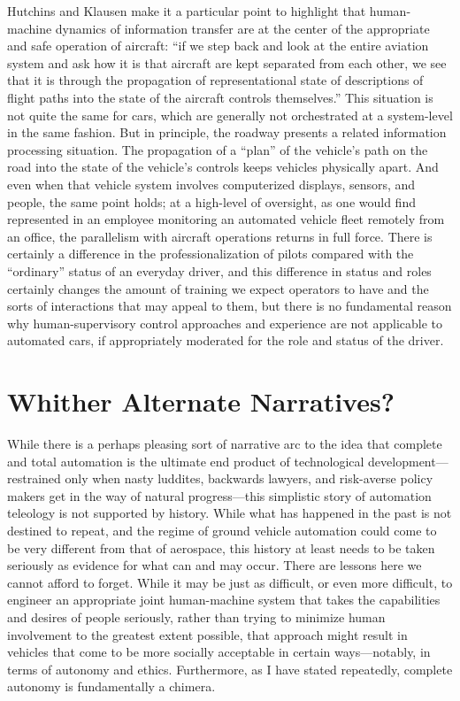 Hutchins and Klausen make it a particular point to highlight that
human-machine dynamics of information transfer are at the center of
the appropriate and safe operation of aircraft: ``if we step back and
look at the entire aviation system and ask how
it is that aircraft are kept separated from each other, we see that it
is through the propagation of representational state of descriptions
of flight paths into the state of the aircraft controls
themselves.''\cite[p. 14]{hutchinsKlausen} This situation is not quite
the same for cars, which are generally not orchestrated at a
system-level in the same fashion. But in principle, the roadway presents a related
information processing situation. The propagation of a ``plan'' of the
vehicle's path on the 
road into the state of the vehicle's controls keeps vehicles
physically apart.
And even when that vehicle system involves computerized
displays, sensors, and people, the same point holds;  at a high-level of oversight, as
one would find represented in an employee monitoring an automated
vehicle fleet remotely 
from an office, the parallelism with aircraft operations returns in
full force. There is certainly a difference in the
professionalization of pilots compared with the ``ordinary'' status of an
everyday driver, and this difference in status and roles certainly
changes the amount of training we expect operators to have and the
sorts of interactions that may appeal to them, but there is no
fundamental reason why human-supervisory control approaches and
experience are not applicable to automated cars, if appropriately
moderated for the role and status of the driver. 

\section{Whither Alternate Narratives?}

While there is a perhaps pleasing sort of narrative arc to the idea
that complete and total automation is the ultimate end product of
technological development---restrained only when nasty luddites, backwards lawyers, and
risk-averse policy makers get in the way of natural progress---this
simplistic story of automation
teleology is not supported by history. While what has happened in the
past is not destined to repeat, and the regime of ground vehicle
automation could come to be very different from that of aerospace,
this history at least needs to be taken seriously as evidence for what
can and may occur. There are lessons here we cannot afford to forget.
While it may be just as difficult, or even more difficult, to engineer
an appropriate joint human-machine system that takes the capabilities
and desires of people seriously, rather than trying to minimize human
involvement to the greatest extent possible, that approach might
result in vehicles that 
come to be more socially acceptable in certain ways---notably, in
terms of autonomy and ethics. Furthermore, as I have stated
repeatedly, complete autonomy is fundamentally a chimera.

